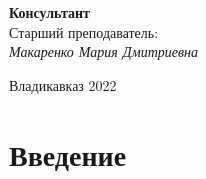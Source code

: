 \documentclass[a4paper,12pt]{article}
\begin{document}
	\hfill
	
	\begin{flushright}
		\textbf{Консультант}\\
		Старший преподаватель: \\
		\textit{Макаренко Мария Дмитриевна \underline{\hspace{3cm}}}\\
	\end{flushright}
	
	\normalsize{ \hspace{28pt}} \hfill \break
	\begin{center} Владикавказ 2022 \end{center}
	
	\thispagestyle{empty}
	\tableofcontents
	\thispagestyle{empty}
	\clearpage
	\newtheorem{theorem}{Теорема}
	
	\section{Введение}
	
	
	\clearpage
\end{document}
